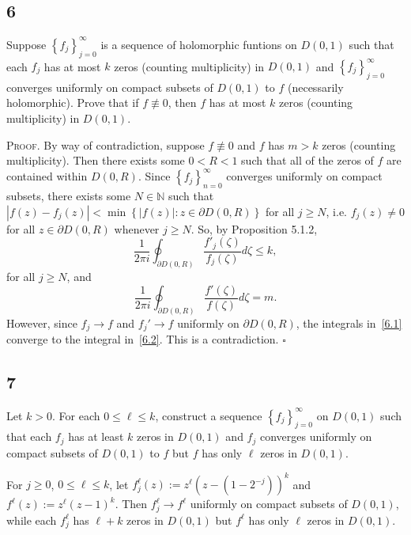 \documentclass[12pt]{article}
\newcounter{ProofCounter}
\newenvironment{Proof}{\stepcounter{ProofCounter}\textsc{Proof.}}{\hfill$\square$}
\begin{document}
\subsection*{6}
\begin{tcolorbox}
  Suppose $\left\{ f_j \right\}_{j=0}^{\infty}$ is a sequence of holomorphic funtions on $D(0,1)$ such that each $f_j$ has at most $k$ zeros (counting
  multiplicity) in $D(0,1)$ and $\left\{ f_j \right\}_{j=0}^{\infty}$ converges uniformly on compact subsets of $D(0,1)$ to $f$ (necessarily
  holomorphic). Prove that if $f
  \not\equiv 0$, then $f$ has at most $k$ zeros (counting multiplicity) in $D(0,1)$.
\end{tcolorbox}
\begin{Proof}
  By way of contradiction, suppose $f \not\equiv 0$ and $f$ has $m > k$ zeros (counting multiplicity). Then there exists some $0 < R < 1$ such that
  all of the zeros of $f$ are contained within $D(0,R)$. Since $\left\{ f_j \right\}_{n=0}^{\infty}$ converges uniformly on compact subsets, there
  exists some $N \in \mathbb{N}$ such that $|f(z) - f_j(z)| < \min\left\{ |f(z)| : z \in \partial D(0,R) \right\}$ for all $j \geq N$, i.e. $f_j(z) \neq
  0$ for all $z \in \partial D(0,R)$ whenever $j \geq N$. So, by Proposition 5.1.2,
  \begin{equation}
    \frac{1}{2\pi i}\oint_{\partial D(0,R)}\frac{f'_j(\zeta)}{f_j(\zeta)}d\zeta \leq k,
    \label{6.1}
  \end{equation}
  for all $j \geq N$, and
  \begin{equation}
    \frac{1}{2\pi i}\oint_{\partial D(0,R)}\frac{f'(\zeta)}{f(\zeta)}d\zeta = m.
    \label{6.2}
  \end{equation}
  However, since $f_j \rightarrow f$ and $f_j' \rightarrow f$ uniformly on $\partial D(0,R)$, the integrals in~\eqref{6.1} converge to the integral
  in~\eqref{6.2}. This is a contradiction.
\end{Proof}

\subsection*{7}
\begin{tcolorbox}
  Let $k > 0$. For each $0 \leq \ell \leq k$, construct a sequence $\left\{ f_j \right\}_{j=0}^{\infty}$ on $D(0,1)$ such that each $f_j$ has at least
  $k$ zeros in $D(0,1)$ and $f_j$ converges uniformly on compact subsets of $D(0,1)$ to $f$ but $f$ has only $\ell$ zeros in $D(0,1)$.
\end{tcolorbox}
For $j \geq 0$, $0 \leq \ell \leq k$, let $f_{j}^{\ell}(z) := z^{\ell}(z - (1 - 2^{-j}))^{k}$ and $f^{\ell}(z) := z^{\ell}(z - 1)^{k}$. Then
$f_{j}^{\ell} \rightarrow f^{\ell}$ uniformly on compact subsets of $D(0,1)$, while each $f_{j}^{\ell}$ has $\ell + k$ zeros in $D(0,1)$ but $f^{\ell}$
has only $\ell$ zeros in $D(0,1)$.
\end{document}
